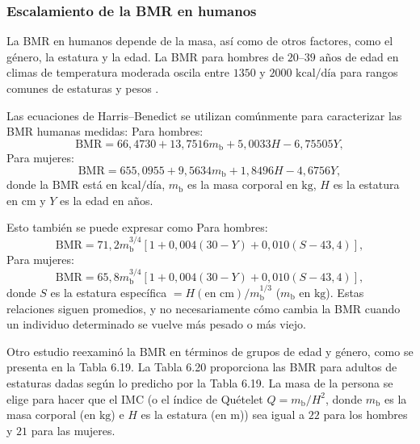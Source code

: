 \documentclass[12pt]{book}
\begin{document}
\subsubsection*{Escalamiento de la BMR en humanos}

La BMR en humanos depende de la masa, así como de otros factores, como el género, la estatura y la edad. La BMR para hombres de $20\text{--}39\text{ años}$ de edad en climas de temperatura moderada oscila entre $1350$ y $2000\text{ kcal/día}$ para rangos comunes de estaturas y pesos \cite{34}.

Las ecuaciones de Harris--Benedict se utilizan comúnmente para caracterizar las BMR humanas medidas:
Para hombres:
\begin{equation}
\text{BMR} = 66{,}4730 + 13{,}7516 m_{\text{b}} + 5{,}0033 H - 6{,}75505 Y,
\label{eq:628}
\end{equation}
Para mujeres:
\begin{equation}
\text{BMR} = 655{,}0955 + 9{,}5634 m_{\text{b}} + 1{,}8496 H - 4{,}6756 Y,
\label{eq:629}
\end{equation}
donde la $\text{BMR}$ está en $\text{kcal/día}$, $m_{\text{b}}$ es la masa corporal en $\text{kg}$, $H$ es la estatura en $\text{cm}$ y $Y$ es la edad en años.

Esto también se puede expresar como
Para hombres:
\begin{equation}
\text{BMR} = 71{,}2 m_{\text{b}}^{3/4} [1 + 0{,}004(30 - Y) + 0{,}010(S - 43{,}4)],
\label{eq:630}
\end{equation}
Para mujeres:
\begin{equation}
\text{BMR} = 65{,}8 m_{\text{b}}^{3/4} [1 + 0{,}004(30 - Y) + 0{,}010(S - 43{,}4)],
\label{eq:631}
\end{equation}
donde $S$ es la estatura específica $= H (\text{en cm}) / m_{\text{b}}^{1/3}$ ($m_{\text{b}}$ en $\text{kg}$). Estas relaciones siguen promedios, y no necesariamente cómo cambia la BMR cuando un individuo determinado se vuelve más pesado o más viejo.

Otro estudio reexaminó la BMR en términos de grupos de edad y género, como se presenta en la Tabla 6.19. La Tabla 6.20 proporciona las BMR para adultos de estaturas dadas según lo predicho por la Tabla 6.19. La masa de la persona se elige para hacer que el IMC (o el índice de Quételet $Q = m_{\text{b}}/H^2$, donde $m_{\text{b}}$ es la masa corporal (en $\text{kg}$) e $H$ es la estatura (en $\text{m}$)) sea igual a $22$ para los hombres y $21$ para las mujeres.
\end{document}
